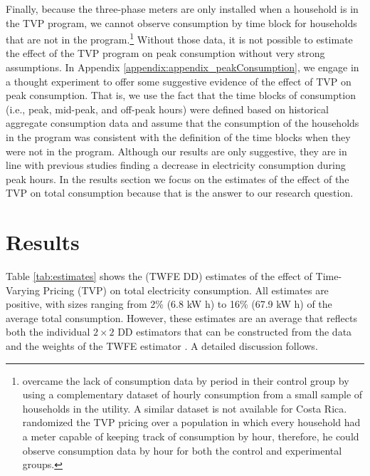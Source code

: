 \documentclass[12pt]{article}
\begin{document}
Finally, because the three-phase meters are only installed when a household is in the TVP program, we cannot observe consumption by time block for households that are not in the program.\footnote{\citet{jessoeUnderstandingRolePrice2014} overcame the lack of consumption data by period in their control group by using a complementary dataset of hourly consumption from a small sample of households in the utility. A similar dataset is not available for Costa Rica. \citet{allcottRethinkingRealtimeElectricity2011} randomized the TVP pricing over a population in which every household had a meter capable of keeping track of consumption by hour, therefore, he could observe consumption data by hour for both the control and experimental groups.} Without those data, it is not possible to estimate the effect of the TVP program on  peak consumption without very strong assumptions. In Appendix \ref{appendix:appendix_peakConsumption}, we engage in a thought experiment to offer some suggestive evidence of the effect of TVP on peak consumption. That is, we use the fact that the time blocks of consumption (i.e., peak, mid-peak, and off-peak hours) were defined based on historical aggregate consumption data and assume that the consumption of the households in the program was consistent with the definition of the time blocks when they were not in the program. Although our results are only suggestive, they are in line with previous studies finding a decrease in electricity consumption during peak hours. In the results section we focus on the estimates of the effect of the TVP on total consumption because that is the answer to our research question.

\section{Results}

Table \ref{tab:estimates} shows the (TWFE DD) estimates of the effect of Time-Varying Pricing (TVP) on total electricity consumption. All estimates are positive, with sizes ranging from 2\%  (6.8 kW h) to 16\% (67.9 kW h) of the average total consumption. However, these estimates are an average that reflects both the individual $2 \times 2$  DD estimators that can be constructed from the data and the weights of the TWFE estimator \citep{goodman-baconDifferenceinDifferencesVariationTreatment2018}. A detailed discussion follows.
\end{document}
